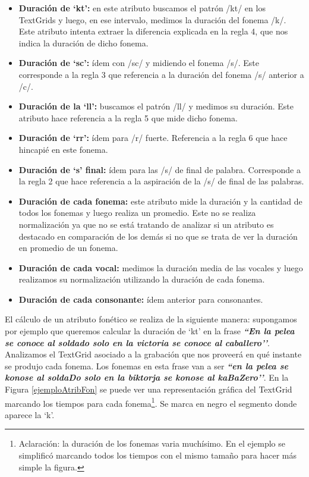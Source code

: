 \begin{itemize}
    \item \textbf{Duración de `kt’:} en este atributo buscamos el patrón /kt/ en los TextGrids y luego, en ese intervalo, medimos la duración del fonema /k/. Este atributo intenta extraer la diferencia explicada en la regla 4, que nos indica la duración de dicho fonema.
    \item \textbf{Duración de `sc’:} ídem con /sc/ y midiendo el fonema /s/. Este corresponde a la regla 3 que referencia a la duración del fonema /s/ anterior a /c/.  
    \item \textbf{Duración de la `ll’:} buscamos el patrón /ll/ y medimos su duración. Este atributo hace referencia a la regla 5 que mide dicho fonema.
    \item \textbf{Duración de `rr’:} ídem para /r/ fuerte. Referencia a la regla 6 que hace hincapié en este fonema.
    \item \textbf{Duración de `s’ final:} ídem para las /s/ de final de palabra. Corresponde a la regla 2 que hace referencia a la aspiración de la /s/ de final de las palabras.  
    \item \textbf{Duración de cada fonema:} este atributo mide la duración y la cantidad de todos los fonemas y luego realiza un promedio. Este no se realiza normalización ya que no se está tratando de analizar si un atributo es destacado en comparación de los demás si no que se trata de ver la duración en promedio de un fonema.
    \item \textbf{Duración de cada vocal:} medimos la duración media de las vocales y luego realizamos su normalización utilizando la duración de cada fonema.
    \item \textbf{Duración de cada consonante:} ídem anterior para consonantes. 
\end{itemize}

El cálculo de un atributo fonético se realiza de la siguiente manera: supongamos por ejemplo que queremos calcular la duración de `kt’ en la frase \textbf{\textit{``En la pelea se conoce al soldado solo en la victoria se conoce al caballero’’}}. Analizamos el TextGrid asociado a la grabación que nos proveerá en qué instante se produjo cada fonema. Los fonemas en esta frase van a ser \textbf{\textit{``en la pelea se konose al soldaDo solo en la biktorja se konose al kaBaZero’’}}. En la Figura \ref{ejemploAtribFon} se puede ver una representación gráfica del TextGrid marcando los tiempos para cada fonema\footnote{Aclaración: la duración de los fonemas varia muchísimo. En el ejemplo se simplificó marcando todos los tiempos con el mismo tamaño para hacer más simple la figura.}. Se marca en negro el segmento donde aparece la `k’.

